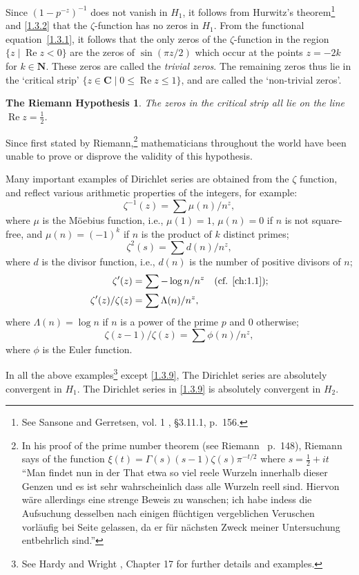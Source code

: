 \documentclass[10pt,leqno]{article}
\newtheorem{rh}[theo]{The Riemann Hypothesis}
\theoremstyle{definition}
\def\NN{\mathbf{N}}
\def\CC{\mathbf{C}}
\DeclareMathOperator{\re}{Re}
\def\qw#1{`#1'}
\def\fnonze{See Sansone and Gerretsen, vol. 1 \cite{bib:162}, \S3.11.1, p.~156.}
\def\fnonon{In his proof of the prime number theorem (see Riemann~\cite{bib:155} p.~148), Riemann says of the function $\xi(t) = \Gamma(s) (s-1) \zeta(s) \pi^{-t/2}$ where $s = \frac12 + it$ ``Man findet nun in der That etwa so viel reele Wurzeln innerhalb dieser Genzen und es ist sehr wahrscheinlich dass alle Wurzeln reell sind. Hiervon w\"are allerdings eine strenge Beweis zu wanschen; ich habe indess die Aufsuchung desselben nach einigen fl\"uchtigen vergeblichen Veruschen vorl\"aufig bei Seite gelassen, da er f\"ur n\"achsten Zweck meiner Untersuchung entbehrlich sind.''}
\def\fnontw{See Hardy and Wright \cite{bib:86}, Chapter 17 for further details and examples.}
\begin{document}
Since $(1-p^{-z})^{-1}$ does not vanish in $H_1$, it follows from Hurwitz's theorem\footnote{\fnonze} and \ref{1.3.2} that the $\zeta$-function has no zeros in $H_1$.
From the functional equation~\eqref{1.3.1}, it follows that the only zeros of the $\zeta$-function in the region $\{ z \mid \re z < 0 \}$ are the zeros of $\sin(\pi z / 2)$ which occur at the points $z = -2k$ for $k \in \NN$.
These zeros are called the \emph{trivial zeros}.
The remaining zeros thus lie in the \qw{critical strip} $\{z \in \CC \mid 0 \leq \re z \leq 1 \}$, and are called the \qw{non-trivial zeros}.


\begin{rh}
\label{1.3.4}
The zeros in the critical strip all lie on the line $\re z = \frac12$.
\end{rh}


Since first stated by Riemann,\footnote{\fnonon} mathematicians throughout the world have been unable to prove or disprove the validity of this hypothesis.

Many important examples of Dirichlet series are obtained from the $\zeta$ function, and reflect various arithmetic properties of the integers, for example:
\begin{equation}
\label{1.3.5}
\zeta^{-1}(z) = \sum \mu(n) / n^z,
\end{equation}
where $\mu$ is the M\"oebius function, i.e., $\mu(1) = 1$, $\mu(n) = 0$ if $n$ is not square-free, and $\mu(n) = (-1)^k$ if $n$ is the product of $k$ distinct primes;
\begin{equation}
\label{1.3.6}
\zeta^2(s) = \sum d(n) / n^z,
\end{equation}
where $d$ is the divisor function, i.e., $d(n)$ is the number of positive divisors of $n$;
\begin{align}
\label{1.3.7}
\zeta'(z) &= \sum -\log n / n^z
\quad\text{(cf. \ref{ch:1.1})};
\\
\label{1.3.8}
\zeta'(z) / \zeta(z) &= \sum \Lambda(n) / n^z,
\end{align}
where $\Lambda(n) = \log n$ if $n$ is a power of the prime $p$ and $0$ otherwise;
\begin{equation}
\label{1.3.9}
\zeta(z-1)/\zeta(z) = \sum \phi(n) / n^z,
\end{equation}
where $\phi$ is the Euler function.

In all the above examples\footnote{\fnontw} except \eqref{1.3.9}, The Dirichlet series are absolutely convergent in $H_1$.
The Dirichlet series in \eqref{1.3.9} is absolutely convergent in $H_2$.
\end{document}
